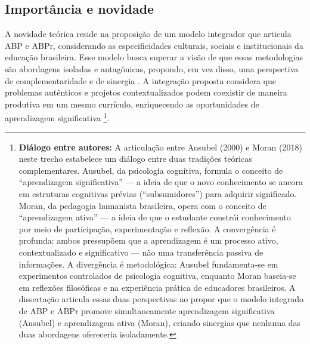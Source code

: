 \subsection{Importância e novidade}
\label{subsec:jt_importancia}

A novidade teórica reside na proposição de um modelo integrador que articula ABP e ABPr, considerando as especificidades culturais, sociais e institucionais da educação brasileira. Esse modelo busca superar a visão de que essas metodologias são abordagens isoladas e antagônicas, propondo, em vez disso, uma perspectiva de complementaridade e de sinergia \cite{BACICH2018}. A integração proposta considera que problemas autênticos e projetos contextualizados podem coexistir de maneira produtiva em um mesmo currículo, enriquecendo as oportunidades de aprendizagem significativa \cite{AUSUBEL2000}\footnote{\textbf{Diálogo entre autores:} A articulação entre Ausubel (2000) e Moran (2018) neste trecho estabelece um diálogo entre duas tradições teóricas complementares. Ausubel, da psicologia cognitiva, formula o conceito de ``aprendizagem significativa'' — a ideia de que o novo conhecimento se ancora em estruturas cognitivas prévias (``subsumidores'') para adquirir significado. Moran, da pedagogia humanista brasileira, opera com o conceito de ``aprendizagem ativa'' — a ideia de que o estudante constrói conhecimento por meio de participação, experimentação e reflexão. A convergência é profunda: ambos pressupõem que a aprendizagem é um processo ativo, contextualizado e significativo — não uma transferência passiva de informações. A divergência é metodológica: Ausubel fundamenta-se em experimentos controlados de psicologia cognitiva, enquanto Moran baseia-se em reflexões filosóficas e na experiência prática de educadores brasileiros. A dissertação articula essas duas perspectivas ao propor que o modelo integrado de ABP e ABPr promove simultaneamente aprendizagem significativa (Ausubel) e aprendizagem ativa (Moran), criando sinergias que nenhuma das duas abordagens ofereceria isoladamente.}.

